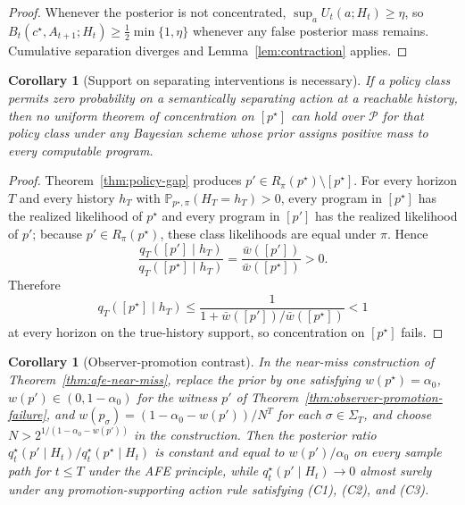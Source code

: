 \documentclass[11pt]{article}
\newtheorem{corollary}[theorem]{Corollary}
\theoremstyle{definition}
\theoremstyle{remark}
\newcommand{\Pcal}{\mathcal{P}}
\newcommand{\Prob}{\mathbb{P}}
\begin{document}
\begin{proof}
Whenever the posterior is not concentrated, $\sup_a U_t(a;H_t)\ge\eta$, so $B_t(c^\star,A_{t+1};H_t)\ge\tfrac{1}{2}\min\{1,\eta\}$ whenever any false posterior mass remains. Cumulative separation diverges and Lemma~\ref{lem:contraction} applies.
\end{proof}

\begin{corollary}[Support on separating interventions is necessary]
\label{cor:support-necessary}
If a policy class permits zero probability on a semantically separating action at a reachable history, then no uniform theorem of concentration on $[p^\star]$ can hold over $\Pcal$ for that policy class under any Bayesian scheme whose prior assigns positive mass to every computable program.
\end{corollary}

\begin{proof}
Theorem~\ref{thm:policy-gap} produces $p'\in R_\pi(p^\star)\setminus[p^\star]$. For every horizon $T$ and every history $h_T$ with $\Prob_{p^\star,\pi}(H_T=h_T)>0$, every program in $[p^\star]$ has the realized likelihood of $p^\star$ and every program in $[p']$ has the realized likelihood of $p'$; because $p'\in R_\pi(p^\star)$, these class likelihoods are equal under $\pi$. Hence
\[
\frac{q_T([p']\mid h_T)}{q_T([p^\star]\mid h_T)}
=
\frac{\bar w([p'])}{\bar w([p^\star])}
>0.
\]
Therefore
\[
q_T([p^\star]\mid h_T)\le \frac{1}{1+\bar w([p'])/\bar w([p^\star])}<1
\]
at every horizon on the true-history support, so concentration on $[p^\star]$ fails.
\end{proof}

\begin{corollary}[Observer-promotion contrast]
\label{cor:promotion-contrast}
In the near-miss construction of Theorem~\ref{thm:afe-near-miss}, replace the prior by one satisfying $w(p^\star)=\alpha_0$, $w(p')\in(0,1-\alpha_0)$ for the witness $p'$ of Theorem~\ref{thm:observer-promotion-failure}, and $w(p_\sigma)=(1-\alpha_0-w(p'))/N^T$ for each $\sigma\in\Sigma_T$, and choose $N>2^{1/(1-\alpha_0-w(p'))}$ in the construction. Then the posterior ratio $q_t^\star(p'\mid H_t)/q_t^\star(p^\star\mid H_t)$ is constant and equal to $w(p')/\alpha_0$ on every sample path for $t\le T$ under the AFE principle, while $q_t^\star(p'\mid H_t)\to 0$ almost surely under any promotion-supporting action rule satisfying (C1), (C2), and (C3).
\end{corollary}
\end{document}

